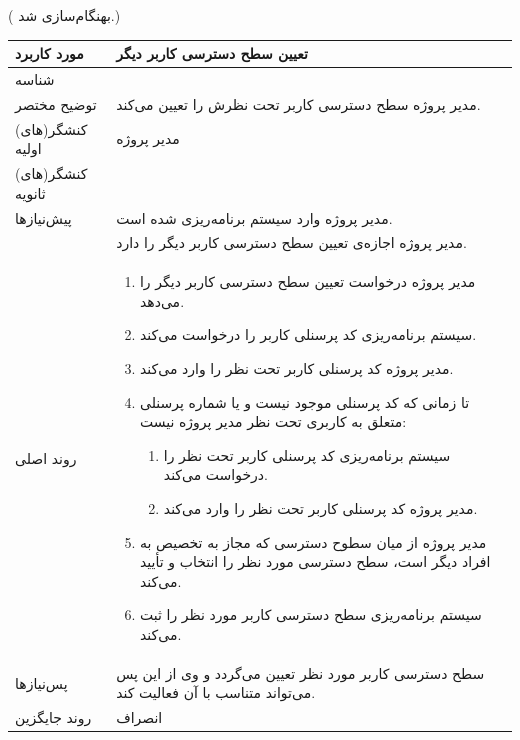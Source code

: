 \newpage
({\color{red} بهنگام‌سازی شد.})
\begin{table}[H]
	\centering
	\begin{tabular}{|p{3cm}|p{10cm}|}
		\hline
		مورد کاربرد & تعیین سطح دسترسی کاربر دیگر  \\
		\hline
		شناسه & 
		\stepcounter{usecase_ID}
		\arabic{usecase_ID} \\
		\hline
		توضیح مختصر & مدیر پروژه سطح دسترسی کاربر تحت نظرش را تعیین می‌کند. \\
		\hline
		کنشگر(های) اولیه & مدیر پروژه \\
		\hline
		کنشگر(های) ثانویه &  \\
		\hline
		پیش‌نیازها & مدیر پروژه وارد سیستم برنامه‌ریزی شده است. \\
		& مدیر پروژه اجازه‌ی تعیین سطح دسترسی کاربر دیگر را دارد.\\
		\hline
		
		روند اصلی &
		\begin{enumerate}[topsep=0cm,leftmargin=0.5cm]
			\item مدیر پروژه درخواست تعیین سطح دسترسی کاربر دیگر را می‌دهد. 
			\item سیستم برنامه‌ریزی کد پرسنلی کاربر را درخواست می‌کند. 
			\item مدیر پروژه کد پرسنلی کاربر تحت نظر را وارد می‌کند. 
			\item تا زمانی که کد پرسنلی موجود نیست و یا شماره پرسنلی متعلق به کاربری تحت نظر مدیر پروژه نیست: 
			\begin{enumerate}[topsep=0cm,leftmargin=0.5cm]
				\item سیستم برنامه‌ریزی کد پرسنلی کاربر تحت نظر را درخواست می‌کند.
				\item مدیر پروژه کد پرسنلی کاربر تحت نظر را وارد می‌کند.
			\end{enumerate} 
			\item مدیر پروژه از میان سطوح دسترسی که مجاز به تخصیص به افراد دیگر است، سطح دسترسی مورد نظر را انتخاب و تأ‌یید می‌کند. 
			\item سیستم برنامه‌ریزی سطح دسترسی کاربر مورد نظر را ثبت می‌کند. 
		\end{enumerate} \\
		\hline
		
		پس‌نیازها & سطح دسترسی کاربر مورد نظر تعیین می‌گردد و وی از این پس می‌تواند متناسب با آن فعالیت کند. \\
		\hline
		روند جایگزین & انصراف \\
		\hline
	\end{tabular}
\end{table}

